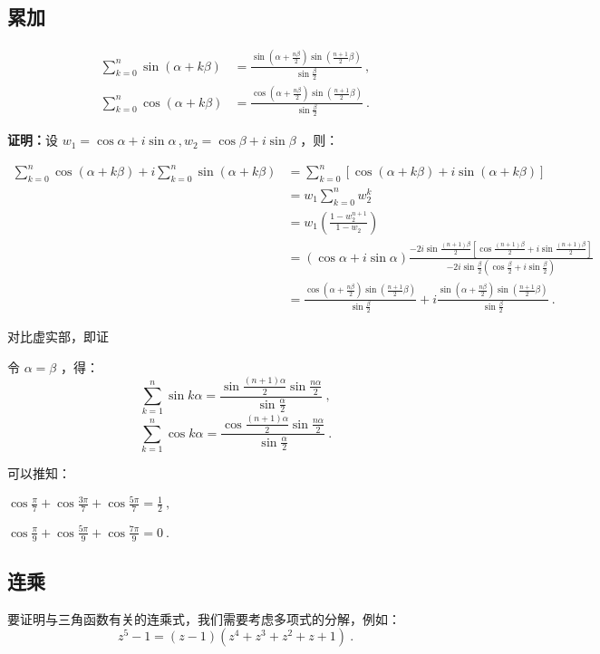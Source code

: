 \subsection{累加}
\begin{theorem}{}

\begin{equation}%
\begin{aligned}
\sum_{k=0}^n\sin(\alpha+k\beta)&=\frac{\sin\left(\alpha+\frac{n\beta}2\right)\sin\left(\frac{n+1}2\beta\right)}{\sin\frac{\beta}2}~,\\\sum_{k=0}^n\cos(\alpha+k\beta)&=\frac{\cos\left(\alpha+\frac{n\beta}2\right)\sin\left(\frac{n+1}2\beta\right)}{\sin\frac{\beta}2}~.
\end{aligned}
\end{equation}

\textbf{证明：}设 $w_1=\cos \alpha+i\sin\alpha\,,w_2=\cos \beta+i\sin\beta$ ，则：

$$\begin{aligned}
\sum_{k=0}^n\cos(\alpha+k\beta)+i\sum_{k=0}^n\sin(\alpha+k\beta)&=\sum_{k=0}^n\left[\cos(\alpha+k\beta)+i\sin(\alpha+k\beta)\right]\\&=w_1\sum_{k=0}^nw_2^k \\&=w_1\left(\frac{1-w_2^{n+1}}{1-w_2}\right)\\ &=(\cos \alpha+i\sin\alpha)\frac{-2i\sin{\frac{(n+1)\beta}2}\left[\cos{\frac{(n+1)\beta}2}+i\sin{\frac{(n+1)\beta}2}\right]}{-2i\sin{\frac{\beta}2}\left(\cos{\frac{\beta}2}+i\sin{\frac{\beta}2}\right)}\\ &=\frac{\cos\left(\alpha+\frac{n\beta}2\right)\sin\left(\frac{n+1}2\beta\right)}{\sin\frac{\beta}2}+i\frac{\sin\left(\alpha+\frac{n\beta}2\right)\sin\left(\frac{n+1}2\beta\right)}{\sin\frac{\beta}2}~.
\end{aligned}$$

对比虚实部，即证
\end{theorem}

令 $\alpha=\beta$ ，得：
$$\sum_{k=1}^n\sin k\alpha=\frac{\sin{\frac{(n+1)\alpha}2}\sin{\frac{n\alpha}{2}}}{\sin{\frac{\alpha}2}}~,$$ $$\sum_{k=1}^n\cos k\alpha=\frac{\cos{\frac{(n+1)\alpha}2}\sin{\frac{n\alpha}{2}}}{\sin{\frac{\alpha}2}}~.$$ 

可以推知：

$\displaystyle{\cos\frac{\pi}{7}+\cos\frac{3\pi}{7}+\cos\frac{5\pi}{7}=\frac{1}{2}}~,$

$\displaystyle{\cos\frac{\pi}{9}+\cos\frac{5\pi}{9}+\cos\frac{7\pi}{9}=0}~.$

\subsection{连乘}
要证明与三角函数有关的连乘式，我们需要考虑多项式的分解，例如：
$$z^5-1=(z-1)(z^4+z^3+z^2+z+1)~.$$


